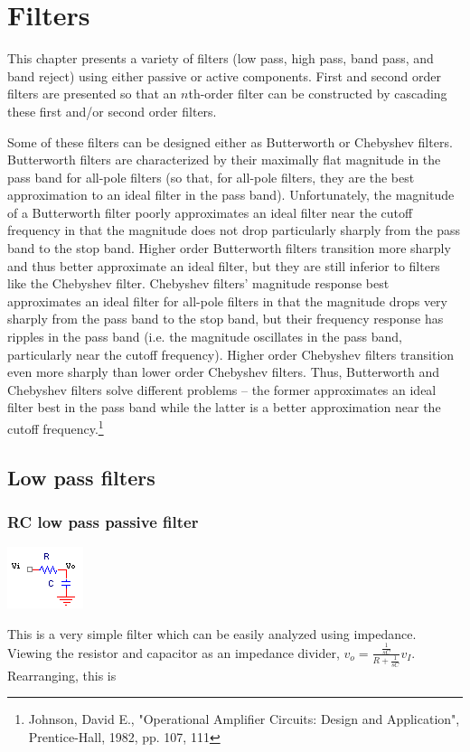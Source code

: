 \chapter{Filters}
This chapter presents a variety of filters (low pass, high pass, band pass, and band reject) using either passive or active components. First and second order filters are presented so that an $n$th-order filter can be constructed by cascading these first and/or second order filters.
\par Some of these filters can be designed either as Butterworth or Chebyshev filters. Butterworth filters are characterized by their maximally flat magnitude in the pass band for all-pole filters (so that, for all-pole filters, they are the best approximation to an ideal filter in the pass band). Unfortunately, the magnitude of a Butterworth filter poorly approximates an ideal filter near the cutoff frequency in that the magnitude does not drop particularly sharply from the pass band to the stop band. Higher order Butterworth filters transition more sharply and thus better approximate an ideal filter, but they are still inferior to filters like the Chebyshev filter. Chebyshev filters' magnitude response best approximates an ideal filter for all-pole filters in that the magnitude drops very sharply from the pass band to the stop band, but their frequency response has ripples in the pass band (i.e. the magnitude oscillates in the pass band, particularly near the cutoff frequency). Higher order Chebyshev filters transition even more sharply than lower order Chebyshev filters. Thus, Butterworth and Chebyshev filters solve different problems -- the former approximates  an ideal filter best in the pass band while the latter is a better approximation near the cutoff frequency.\footnote{Johnson, David E., "Operational Amplifier Circuits: Design and Application", Prentice-Hall, 1982, pp. 107, 111}

\section{Low pass filters}

\subsection{RC low pass passive filter}
\begin{center}
	\includegraphics{schematics/rcLPfilter.PNG}
\end{center}
This is a very simple filter which can be easily analyzed using impedance. Viewing the resistor and capacitor as an impedance divider, $v_{o} = \frac{\frac{1}{sC}}{R+\frac{1}{sC}}v_{I}$. Rearranging, this is

